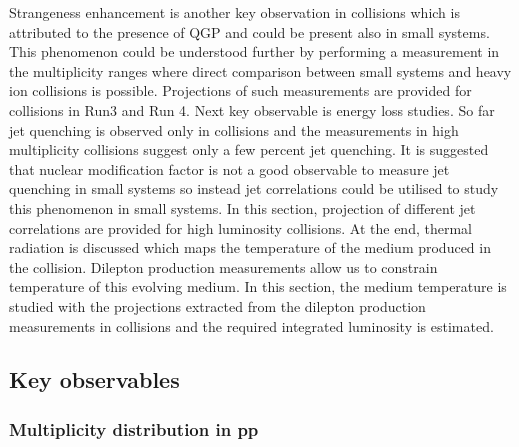 \documentclass[../report.tex]{subfiles}
\begin{document}
\noindent Strangeness enhancement is another key observation in \PbPb collisions which is attributed to the presence of QGP and could be present also in small systems. This phenomenon could be understood further by performing a measurement in the multiplicity ranges where direct comparison between small systems and heavy ion collisions is possible. Projections of such measurements are provided for \pp collisions in Run3 and Run 4. Next key observable is energy loss studies. So far jet quenching is observed only in \PbPb collisions and the measurements in high multiplicity \pPb collisions suggest only a few percent jet quenching. It is suggested that nuclear modification factor is not a good observable to measure jet quenching in small systems so instead jet correlations could be utilised to study this phenomenon in small systems. In this section, projection of different jet correlations are provided for high luminosity \pp collisions. At the end, thermal radiation is discussed which maps the temperature of the medium produced in the collision. Dilepton production measurements allow us to constrain temperature of this evolving medium. In this section, the medium temperature is studied with the projections extracted from the dilepton production measurements in \pPb collisions and the required integrated luminosity is estimated. 





\subsection{Key observables}

\subsubsection{Multiplicity distribution in pp}
\end{document}
